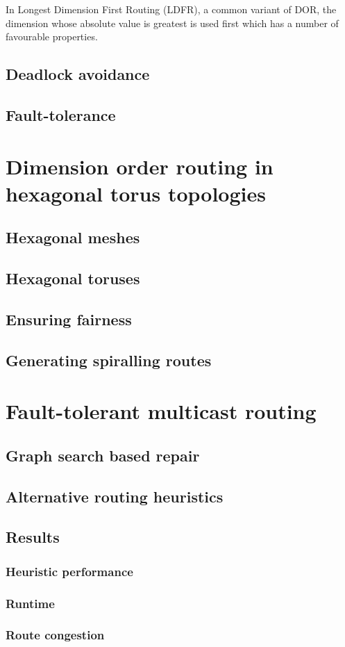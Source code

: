 			In Longest Dimension First Routing (LDFR), a common variant of DOR, the
			dimension whose absolute value is greatest is used first which has a
			number of favourable properties.
		
		\subsection{Deadlock avoidance}
		\subsection{Fault-tolerance}
	
	\section{Dimension order routing in hexagonal torus topologies}
		\subsection{Hexagonal meshes}
		\subsection{Hexagonal toruses}
		\subsection{Ensuring fairness}
		\subsection{Generating spiralling routes}
	
	\section{Fault-tolerant multicast routing}
		\subsection{Graph search based repair}
		\subsection{Alternative routing heuristics}
		\subsection{Results}
			\subsubsection{Heuristic performance}
			\subsubsection{Runtime}
			\subsubsection{Route congestion}
	
